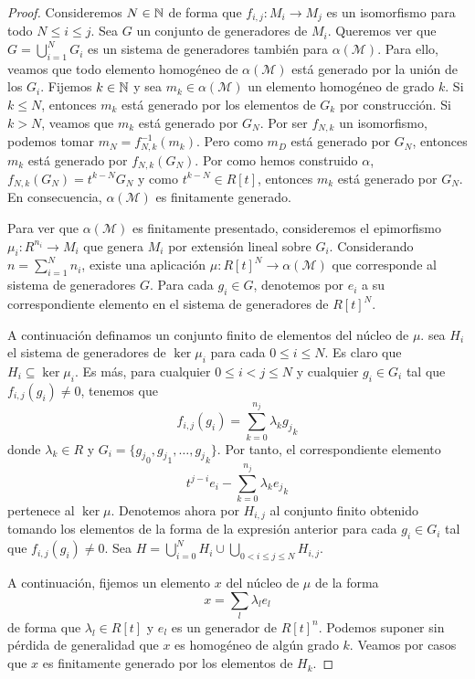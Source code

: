 \begin{proof}
	Consideremos $N \in \mathbb{N}$ de forma que $f_{i,j}: M_{i} \to M_{j}$ es un isomorfismo
	para todo $N \leq i \leq j$. Sea $G$ un conjunto de generadores de $M_{i}$. Queremos
	ver que $G = \bigcup_{i=1}^{N} G_{i}$ es un sistema de generadores también para
	$\alpha(\mathcal{M})$. Para ello, veamos que todo elemento homogéneo de $\alpha
	(\mathcal{M})$ está generado por la unión de los $G_{i}$. Fijemos $k \in \mathbb{N}$ y
	sea $m_{k} \in \alpha(\mathcal{M})$ un elemento homogéneo de grado $k$. Si $k \leq
	N$, entonces $m_{k}$ está generado por los elementos de $G_{k}$ por
	construcción. Si $k > N$, veamos que $m_{k}$ está generado por $G_{N}$. Por ser
	$f_{N,k}$ un isomorfismo, podemos tomar $m_{N} = f^{-1}_{N,k}(m_{k})$. Pero como
	$m_{D}$ está generado por $G_{N}$, entonces $m_{k}$ está generado por
	$f_{N,k}(G_{N})$. Por como hemos construido $\alpha$,
	$f_{N,k}(G_{N}) = t^{k-N}G_{N}$ y como $t^{k-N}\in R[t]$, entonces $m_{k}$ está
	generado por $G_{N}$. En consecuencia, $\alpha(\mathcal{M})$ es finitamente generado.
	
	Para ver que $\alpha(\mathcal{M})$ es finitamente presentado, consideremos el
	epimorfismo $\mu_{i} : R^{n_i}\to M_{i}$ que genera $M_{i}$ por extensión
	lineal sobre $G_{i}$. Considerando $n = \sum_{i=1}^{N} n_{i}$, existe una
	aplicación $\mu : R[t]^{N} \to \alpha(\mathcal{M})$ que corresponde al sistema
	de generadores $G$. Para cada $g_{i} \in G$, denotemos por $e_{i}$ a su
	correspondiente elemento en el sistema de generadores de $R[t]^{N}$.
	
	A continuación definamos un conjunto finito de elementos del núcleo de $\mu$. sea
	$H_{i}$ el sistema de generadores de $\ker \mu_{i}$ para cada $0 \leq i \leq N$.
	Es claro que $H_{i} \subseteq \ker \mu_{i}$. Es más, para cualquier
	$0 \leq i < j \leq N$ y cualquier $g_{i} \in G_{i}$ tal que
	$f_{i,j}(g_{i}) \neq 0$, tenemos que
	\[
	f_{i,j}(g_{i}) = \sum_{k=0}^{n_j}\lambda_{k}{g_j}_{k}
	\]
	donde $\lambda_{k} \in R$ y $G_{i} = \{{g_j}_{0},{g_j}_{1}, \ldots,{g_j}_{k} \}$.
	Por tanto, el correspondiente elemento
	\[
	t^{j-i}e_{i} - \sum_{k=0}^{n_j}\lambda_{k}{e_j}_{k}
	\]
	pertenece al $\ker \mu$. Denotemos ahora por $H_{i,j}$ al conjunto finito
	obtenido tomando los elementos de la forma de la expresión anterior para cada
	$g_{i} \in G_{i}$ tal que $f_{i,j}(g_{i}) \neq 0$. Sea $H = \bigcup_{i=0}^{N} H
	_{i} \cup \bigcup_{0 < i \leq j \leq N}H_{i,j}$.
	
	A continuación, fijemos un elemento $x$ del núcleo de $\mu$ de la forma
	\[
	x = \sum_{l} \lambda_{l} e_{l}
	\]
	de forma que $\lambda_{l} \in R[t]$ y $e_{l}$ es un generador de $R[t]^{n}$. Podemos
	suponer sin pérdida de generalidad que $x$ es homogéneo de algún grado $k$.
	Veamos por casos que $x$ es finitamente generado por los elementos de $H_{k}$.
	

\end{proof}
